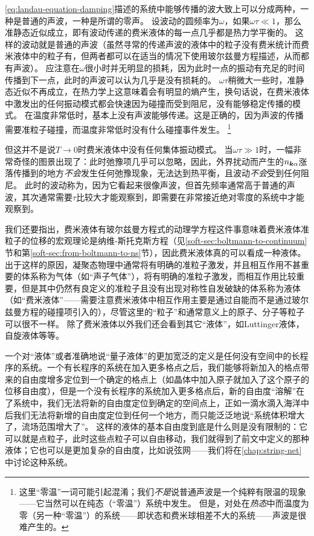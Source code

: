 \eqref{eq:landau-equation-damping}描述的系统中能够传播的波大致上可以分成两种，一种是普通的声波，一种是所谓的零声。
设波动的圆频率为$\omega$，如果$\omega \tau \ll 1$，那么准静态近似成立，即有波动传递的费米液体的每一点几乎都是热力学平衡的。
这样的波动就是普通的声波（虽然寻常的传递声波的液体中的粒子没有费米统计而费米液体中的粒子有，但两者都可以在适当的情况下使用玻尔兹曼方程描述，从而都有声波）。%
应注意在$\omega$很小时并无明显的损耗，因为此时一点的振动有充足的时间传播到下一点，此时的声波可以认为几乎是没有损耗的。
$\omega \tau$稍微大一些时，准静态近似不再成立，在热力学上这意味着会有明显的熵产生，换句话说，在费米液体中激发出的任何振动模式都会快速因为碰撞而受到阻尼，没有能够稳定传播的模式。
在温度非常低时，基本上没有声波能够传递。这是正确的，因为声波的传播需要准粒子碰撞，而温度非常低时没有什么碰撞事件发生。%
\footnote{
    这里“零温”一词可能引起混淆；我们\emph{不是}说普通声波是一个纯粹有限温的现象——它当然可以在纯态（“零温”）系统中发生。
    但是，对处在\emph{热态}中而温度为零（另一种“零温”）的系统——即状态和费米球相差不大的系统——声波是很难产生的。
}%

但这并不是说$T \to 0$时费米液体中没有任何集体振动模式。
当$\omega \tau \gg 1$时，一幅非常奇怪的图景出现了：此时弛豫项几乎可以忽略，因此，外界扰动而产生的$n_{\vb*{k} \alpha}$涨落传播到的地方\emph{不会}发生任何弛豫现象，无法达到热平衡，且波动\emph{不会}受到任何阻尼。
此时的波动称为，因为它看起来很像声波，但首先频率通常高于普通的声波，其次通常需要$\tau$比较大才能观察到，即需要在非常接近绝对零度的系统中才能观察到。

我们还要指出，费米液体有玻尔兹曼方程式的动理学方程这件事意味着费米液体准粒子的位移的宏观理论是纳维-斯托克斯方程（见\ref{soft-sec:boltmann-to-continuum}节和第\ref{soft-sec:from-boltmann-to-ns}节），因此费米液体真的可以看成一种液体。
出于这样的原因，凝聚态物理中通常将有明确的准粒子激发，并且相互作用不甚重要的体系称为气体（如“声子气体”），将有明确的准粒子激发，而相互作用比较重要，但是其中仍然有良定义的准粒子且没有出现对称性自发破缺的体系称为液体（如“费米液体”——需要注意费米液体中相互作用主要是通过自能而不是通过玻尔兹曼方程的碰撞项引入的），尽管这里的“粒子”和通常意义上的原子、分子等粒子可以很不一样。
除了费米液体以外我们还会看到其它“液体”，如Luttinger液体，自旋液体等等。

一个对“液体”或者准确地说“量子液体”的更加宽泛的定义是任何没有空间中的长程序的系统。一个有长程序的系统在加入更多格点之后，我们能够将新加入的格点带来的自由度增多定位到一个确定的格点上（如晶体中加入原子就加入了这个原子的位移自由度），但是一个没有长程序的系统加入更多格点后，新的自由度“溶解”在了系统中，我们无法将新的自由度定位到确定的空间点上，正如一滴水滴入海洋中后我们无法将新增的自由度定位到任何一个地方，而只能泛泛地说“系统体积增大了，流场范围增大了”。
这样的液体的基本自由度到底是什么则是没有限制的：它可以就是点粒子，此时这些点粒子可以自由移动，我们就得到了前文中定义的那种液体；它也可以是更加复杂的自由度，比如说弦网——我们将在\autoref{chap:string-net}中讨论这种系统。

